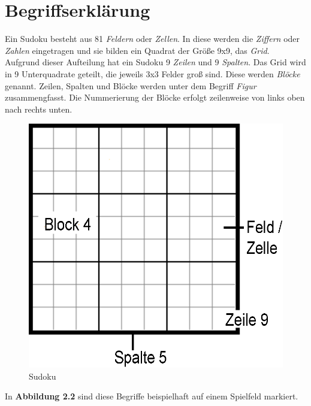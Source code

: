\newpage
\section{Begriffserklärung}
\label{Begriffe}
Ein Sudoku besteht aus 81 \textit{Feldern} oder \textit{Zellen}. In diese werden die \textit{Ziffern} oder \textit{Zahlen} eingetragen und sie bilden ein Quadrat der Größe 9x9, das \textit{Grid}. Aufgrund dieser Aufteilung hat ein Sudoku 9 \textit{Zeilen} und 9 \textit{Spalten}. Das Grid wird in 9 Unterquadrate geteilt, die jeweils 3x3 Felder groß sind. Diese werden \textit{Blöcke} genannt. Zeilen, Spalten und Blöcke werden unter dem Begriff \textit{Figur} zusammengfasst. Die Nummerierung der Blöcke erfolgt zeilenweise von links oben nach rechts unten.\\

\begin{figure}[h]
\begin{center}
\includegraphics{./img/begriffe.eps}
\caption{Sudoku}
\end{center}
\end{figure}

\noindent In \textbf{Abbildung 2.2} sind diese Begriffe beispielhaft auf einem Spielfeld markiert.